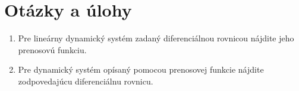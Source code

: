 \documentclass[a4paper, 10pt, ]{article}
\begin{document}
\section{Otázky a úlohy}

\begin{enumerate}[leftmargin=0pt, labelsep=3mm, itemsep=0pt]


    \item Pre lineárny dynamický systém zadaný diferenciálnou rovnicou nájdite jeho prenosovú funkciu.

	\item Pre dynamický systém opísaný pomocou prenosovej funkcie nájdite zodpovedajúcu diferenciálnu rovnicu.

\end{enumerate}







{}
% 

\end{document}
